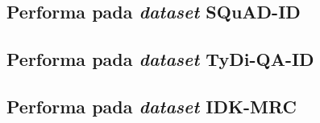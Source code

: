 \subsection{Performa pada  \emph{dataset} SQuAD-ID}

\subsection{Performa pada  \emph{dataset} TyDi-QA-ID}

\subsection{Performa pada  \emph{dataset} IDK-MRC}
